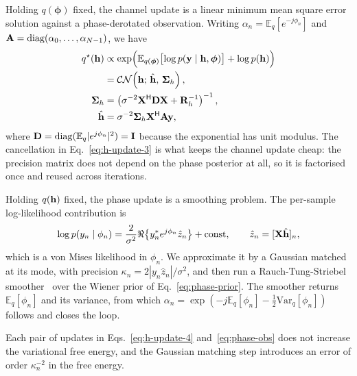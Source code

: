 Holding $q(\boldsymbol{\phi})$ fixed, the channel update is a linear minimum
mean square error solution against a phase-derotated observation. Writing
$\alpha_n = \mathbb{E}_q[e^{-j\phi_n}]$ and
$\mathbf{A} = \operatorname{diag}(\alpha_0, \dots, \alpha_{N-1})$, we have
\begin{align}
  \label{eq:h-update-1}
  q^{\star}(\mathbf{h})
    &\propto \exp\Bigl(
      \mathbb{E}_{q(\boldsymbol{\phi})}\bigl[ \log p(\mathbf{y} \mid
        \mathbf{h}, \boldsymbol{\phi}) \bigr]
      + \log p(\mathbf{h}) \Bigr) \\
  \label{eq:h-update-2}
    &= \mathcal{CN}\!\left( \mathbf{h} ; \, \hat{\mathbf{h}}, \, \boldsymbol{\Sigma}_h
       \right) , \\
  \label{eq:h-update-3}
  \boldsymbol{\Sigma}_h
    &= \left( \sigma^{-2} \mathbf{X}^{\mathsf{H}} \mathbf{D} \mathbf{X}
       + \mathbf{R}_h^{-1} \right)^{-1} , \\
  \label{eq:h-update-4}
  \hat{\mathbf{h}}
    &= \sigma^{-2} \boldsymbol{\Sigma}_h \mathbf{X}^{\mathsf{H}} \mathbf{A} \mathbf{y} ,
\end{align}
where $\mathbf{D} = \operatorname{diag}(\mathbb{E}_q|e^{j\phi_n}|^2) = \mathbf{I}$ because the
exponential has unit modulus. The cancellation in
Eq.~\eqref{eq:h-update-3} is what keeps the channel update cheap: the
precision matrix does not depend on the phase posterior at all, so it is
factorised once and reused across iterations.

Holding $q(\mathbf{h})$ fixed, the phase update is a smoothing problem. The
per-sample log-likelihood contribution is
\begin{equation}
  \label{eq:phase-obs}
  \log p(y_n \mid \phi_n)
  = \frac{2}{\sigma^2} \Re\!\left\{ y_n^{*} e^{j\phi_n} \hat{z}_n \right\}
    + \mathrm{const} ,
  \qquad \hat{z}_n = [\mathbf{X}\hat{\mathbf{h}}]_n ,
\end{equation}
which is a von Mises likelihood in $\phi_n$. We approximate it by a Gaussian
matched at its mode, with precision
$\kappa_n = 2 |y_n \hat{z}_n| / \sigma^2$, and then run a Rauch-Tung-Striebel
smoother~\citep{rauch2015smoothing} over the Wiener prior of Eq.~\eqref{eq:phase-prior}. The smoother
returns $\mathbb{E}_q[\phi_n]$ and its variance, from which
$\alpha_n = \exp(-j\mathbb{E}_q[\phi_n] - \tfrac{1}{2}\mathrm{Var}_q[\phi_n])$
follows and closes the loop.

\begin{lemma}
\label{lem:descent}
Each pair of updates in Eqs.~\eqref{eq:h-update-4} and~\eqref{eq:phase-obs}
does not increase the variational free energy, and the Gaussian matching step
introduces an error of order $\kappa_n^{-2}$ in the free energy.
\end{lemma}

